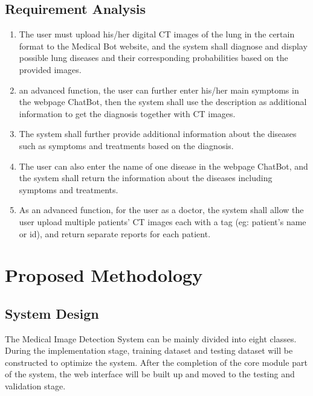 \documentclass[11pt,bibliography=totocnumbered]{article}
\begin{document}
  \subsection{Requirement Analysis}
  
  \begin{enumerate}
  	\item The user must upload his/her digital CT images of the lung in the certain
  	format to the Medical Bot website, and the system shall diagnose and display
  	possible lung diseases and their corresponding probabilities based on the
  	provided images.
  	
  	\item an advanced function, the user can further enter his/her main symptoms in the webpage ChatBot, then the system shall use the description as additional information to get the diagnosis together with CT images.
  	
  	\item The system shall further provide additional information about the diseases such as symptoms and treatments based on the diagnosis.
  	
  	\item The user can also enter the name of one disease in the webpage ChatBot, and
  	the system shall return the information about the diseases including symptoms
  	and treatments.
  	
  	\item As an advanced function, for the user as a doctor, the system shall allow the user
  	upload multiple patients’ CT images each with a tag (eg: patient’s name or id),
  	and return separate reports for each patient.
  \end{enumerate}
  
  \section{Proposed Methodology}
  
  \subsection{System Design}
  
  The Medical Image Detection System can be mainly divided into eight classes.
  During the implementation stage, training dataset and testing dataset will be constructed to optimize the system. After the completion of the core module part of the system, the web interface will be built up and moved to the testing and validation stage.
  
\end{document}

